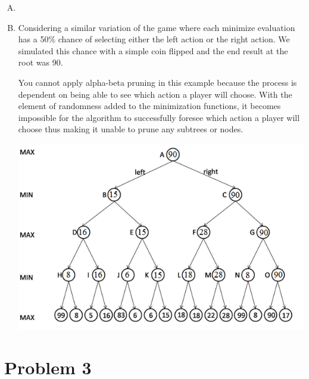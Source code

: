 \documentclass[10pt,a4paper]{article}
\begin{document}
\begin{enumerate}[A.]
		\item
		
		\item
		
		Considering a similar variation of the game where each minimize evaluation has a 50\% chance of selecting either the left action or the right action. We simulated this chance with a simple coin flipped and the end result at the root was 90.
		
		You cannot apply alpha-beta pruning in this example because the process is dependent on being able to see which action a player will choose. With the element of randomness added to the minimization functions, it becomes impossible for the algorithm to successfully foresee which action a player will choose thus making it unable to prune any subtrees or nodes.
		
		\begin{center}
			\includegraphics[scale=0.75]{RandomMinimax}
		\end{center}
		
	\end{enumerate}


	\section*{Problem 3}
\end{document}
